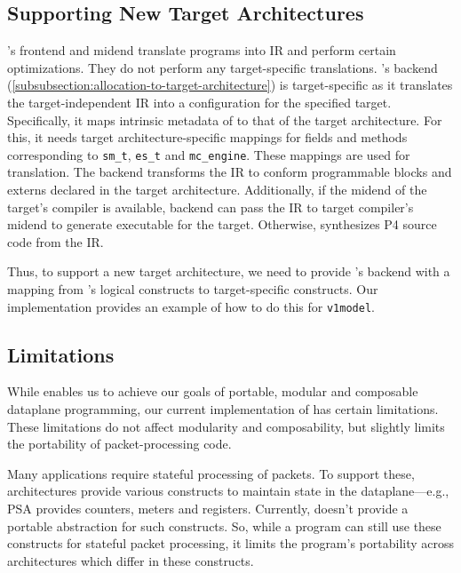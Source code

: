 \documentclass[letterpaper,twocolumn,10pt]{article}
\begin{document}





\subsection{Supporting New Target Architectures}
\label{sec:new-target}
\ucomp's frontend and midend translate \ulang programs into \uarch IR
and perform certain optimizations. They do not perform any
target-specific translations. \ucomp's backend
(\cref{subsubsection:allocation-to-target-architecture}) is
target-specific as it translates the target-independent \uarch IR into
a configuration for the specified target. Specifically, it maps
intrinsic metadata of \uarch to that of the target architecture. For
this, it needs target architecture-specific mappings for fields and
methods corresponding to \texttt{sm\_t}, \texttt{es\_t} and
\texttt{mc\_engine}. These mappings are used for translation. The
backend transforms the IR to conform programmable blocks and externs
declared in the target architecture. Additionally, if the midend of
the target's compiler is available, \ucomp backend can pass the IR to
target compiler's midend to generate executable for the target.
Otherwise, \ucomp synthesizes P4 source code from the IR.

Thus, to support a new target architecture, we need to provide
\ucomp's backend with a mapping from \uarch's logical constructs to
target-specific constructs. Our implementation provides an example of
how to do this for \texttt{v1model}.





\subsection{Limitations}
\label{sec:limitations}
While \ulang enables us to achieve our goals of portable, modular and
composable dataplane programming, our current implementation of \ucomp
has certain limitations. These limitations do not affect modularity
and composability, but slightly limits the portability of
packet-processing code.

Many applications require stateful processing of packets. To support
these, architectures provide various constructs to maintain state in
the dataplane---e.g., PSA provides counters, meters and registers.
Currently, \uarch doesn't provide a portable abstraction for such
constructs. So, while a \ulang program can still use these constructs
for stateful packet processing, it limits the program's portability
across architectures which differ in these constructs.
\end{document}
